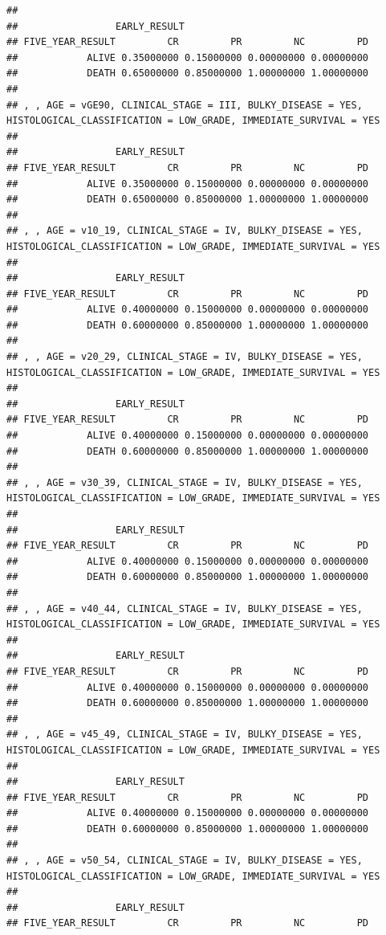 \documentclass[]{article}
\begin{document}
\begin{verbatim}
## 
##                 EARLY_RESULT
## FIVE_YEAR_RESULT         CR         PR         NC         PD
##            ALIVE 0.35000000 0.15000000 0.00000000 0.00000000
##            DEATH 0.65000000 0.85000000 1.00000000 1.00000000
## 
## , , AGE = vGE90, CLINICAL_STAGE = III, BULKY_DISEASE = YES, HISTOLOGICAL_CLASSIFICATION = LOW_GRADE, IMMEDIATE_SURVIVAL = YES
## 
##                 EARLY_RESULT
## FIVE_YEAR_RESULT         CR         PR         NC         PD
##            ALIVE 0.35000000 0.15000000 0.00000000 0.00000000
##            DEATH 0.65000000 0.85000000 1.00000000 1.00000000
## 
## , , AGE = v10_19, CLINICAL_STAGE = IV, BULKY_DISEASE = YES, HISTOLOGICAL_CLASSIFICATION = LOW_GRADE, IMMEDIATE_SURVIVAL = YES
## 
##                 EARLY_RESULT
## FIVE_YEAR_RESULT         CR         PR         NC         PD
##            ALIVE 0.40000000 0.15000000 0.00000000 0.00000000
##            DEATH 0.60000000 0.85000000 1.00000000 1.00000000
## 
## , , AGE = v20_29, CLINICAL_STAGE = IV, BULKY_DISEASE = YES, HISTOLOGICAL_CLASSIFICATION = LOW_GRADE, IMMEDIATE_SURVIVAL = YES
## 
##                 EARLY_RESULT
## FIVE_YEAR_RESULT         CR         PR         NC         PD
##            ALIVE 0.40000000 0.15000000 0.00000000 0.00000000
##            DEATH 0.60000000 0.85000000 1.00000000 1.00000000
## 
## , , AGE = v30_39, CLINICAL_STAGE = IV, BULKY_DISEASE = YES, HISTOLOGICAL_CLASSIFICATION = LOW_GRADE, IMMEDIATE_SURVIVAL = YES
## 
##                 EARLY_RESULT
## FIVE_YEAR_RESULT         CR         PR         NC         PD
##            ALIVE 0.40000000 0.15000000 0.00000000 0.00000000
##            DEATH 0.60000000 0.85000000 1.00000000 1.00000000
## 
## , , AGE = v40_44, CLINICAL_STAGE = IV, BULKY_DISEASE = YES, HISTOLOGICAL_CLASSIFICATION = LOW_GRADE, IMMEDIATE_SURVIVAL = YES
## 
##                 EARLY_RESULT
## FIVE_YEAR_RESULT         CR         PR         NC         PD
##            ALIVE 0.40000000 0.15000000 0.00000000 0.00000000
##            DEATH 0.60000000 0.85000000 1.00000000 1.00000000
## 
## , , AGE = v45_49, CLINICAL_STAGE = IV, BULKY_DISEASE = YES, HISTOLOGICAL_CLASSIFICATION = LOW_GRADE, IMMEDIATE_SURVIVAL = YES
## 
##                 EARLY_RESULT
## FIVE_YEAR_RESULT         CR         PR         NC         PD
##            ALIVE 0.40000000 0.15000000 0.00000000 0.00000000
##            DEATH 0.60000000 0.85000000 1.00000000 1.00000000
## 
## , , AGE = v50_54, CLINICAL_STAGE = IV, BULKY_DISEASE = YES, HISTOLOGICAL_CLASSIFICATION = LOW_GRADE, IMMEDIATE_SURVIVAL = YES
## 
##                 EARLY_RESULT
## FIVE_YEAR_RESULT         CR         PR         NC         PD

\end{verbatim}
\end{document}
